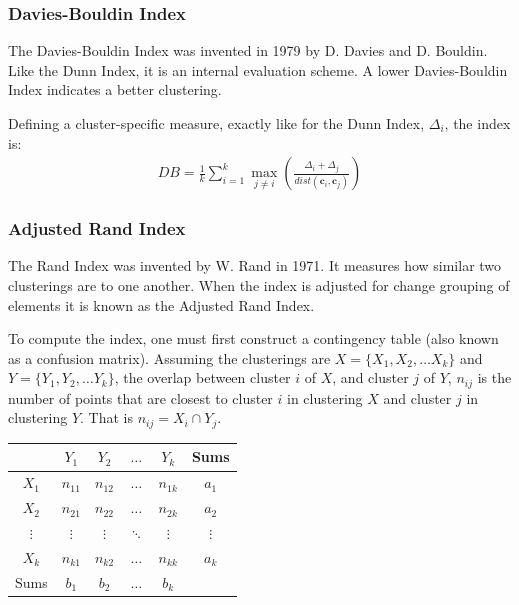 \documentclass{article}
\begin{document}
\subsubsection{Davies-Bouldin Index}
The Davies-Bouldin Index was invented in 1979 by D. Davies and D. Bouldin. Like
the Dunn Index, it is an internal evaluation scheme. A lower Davies-Bouldin
Index indicates a better clustering.

Defining a cluster-specific measure, exactly like for the Dunn Index,
$\Delta_i$, the index is:
\begin{eqnarray}
    DB = \frac{1}{k} \sum_{i = 1}^k \max_{j \ne i} \left( \frac{\Delta_i +
    \Delta_j}{dist(\mathbf{c}_i, \mathbf{c}_j)} \right)
\end{eqnarray}

\subsubsection{Adjusted Rand Index}
The Rand Index was invented by W. Rand in 1971. It measures how similar two
clusterings are to one another. When the index is adjusted for change grouping
of elements it is known as the Adjusted Rand Index.

To compute the index, one must first construct a contingency table (also known
as a confusion matrix). Assuming the clusterings are $X = \{X_1, X_2, \ldots
X_k\}$ and $Y = \{Y_1, Y_2, \ldots Y_k\}$, the overlap between cluster $i$ of
$X$, and cluster $j$ of $Y$, $n_{ij}$ is the number of points that are closest
to cluster $i$ in clustering $X$ and cluster $j$ in clustering $Y$. That is
$n_{ij} = X_i \cap Y_j$.

\begin{center}
    \begin{tabular}{c | c  c  c  c | c}
        & $Y_1$ & $Y_2$ & $\ldots$ & $Y_k$ & Sums \\
        \hline
        $X_1$ & $n_{11}$ & $n_{12}$ & $\ldots$ & $n_{1k}$ & $a_1$ \\
        $X_2$ & $n_{21}$ & $n_{22}$ & $\ldots$ & $n_{2k}$ & $a_2$ \\
        $\vdots$ & $\vdots$ & $\vdots$ & $\ddots$ & $\vdots$ & $\vdots$ \\
        $X_k$ & $n_{k1}$ & $n_{k2}$ & $\ldots$ & $n_{kk}$ & $a_k$ \\
        \hline
        Sums & $b_1$ & $b_2$ & $\ldots$ & $b_k$ & \\
    \end{tabular}
\end{center}
\end{document}
